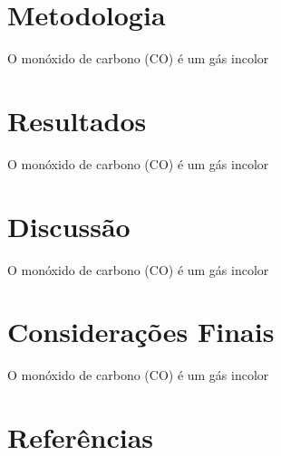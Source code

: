 \documentclass[12pt]{beamer}
\begin{document}
    \section{Metodologia}

    \begin{frame}
        O monóxido de carbono (CO) é um gás incolor 
    \end{frame}

    \section{Resultados}

    \begin{frame}
        O monóxido de carbono (CO) é um gás incolor 
    \end{frame}

    \section{Discussão}

    \begin{frame}
        O monóxido de carbono (CO) é um gás incolor 
    \end{frame}

    \section{Considerações Finais}

    \begin{frame}
        O monóxido de carbono (CO) é um gás incolor 
    \end{frame}

    \section{Referências}
    
    \printbibliography
\end{document}
